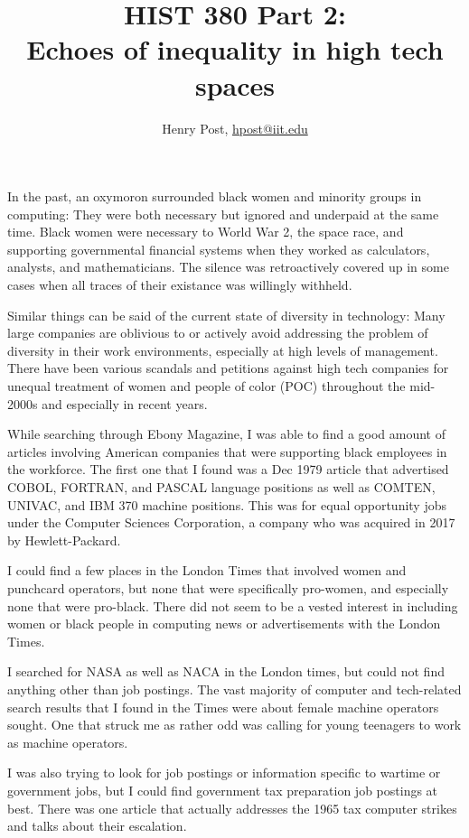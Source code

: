 \documentclass[a4paper,12pt]{article}
\title{HIST 380 Part 2: \\ Echoes of inequality in high tech spaces }
\author{Henry Post, \url{hpost@iit.edu}}
\begin{document}
\maketitle

\newpage

In the past, an oxymoron surrounded black women and minority groups in computing: They were both necessary but ignored and underpaid at the same time. Black women were necessary to World War 2, the space race, and supporting governmental financial systems when they worked as calculators, analysts, and mathematicians. The silence was retroactively covered up in some cases when all traces of their existance was willingly withheld.

Similar things can be said of the current state of diversity in technology: Many large companies are oblivious to or actively avoid addressing the problem of diversity in their work environments, especially at high levels of management. There have been various scandals and petitions against high tech companies for unequal treatment of women and people of color (POC) throughout the mid-2000s and especially in recent years.

While searching through Ebony Magazine, I was able to find a good amount of articles involving American companies that were supporting black employees in the workforce. The first one that I found was a Dec 1979 article\cite{csc} that advertised COBOL, FORTRAN, and PASCAL language positions as well as COMTEN, UNIVAC, and IBM 370 machine positions. This was for equal opportunity jobs under the Computer Sciences Corporation, a company who was acquired in 2017 by Hewlett-Packard.

I could find a few places in the London Times that involved women and punchcard operators, but none that were specifically pro-women, and especially none that were pro-black. There did not seem to be a vested interest in including women or black people in computing news or advertisements with the London Times.

I searched for NASA as well as NACA in the London times, but could not find anything other than job postings. The vast majority of computer and tech-related search results that I found in the Times were about female machine operators sought. One that struck me as rather odd was calling for young teenagers to work as machine operators\cite{youngmachineop}.

I was also trying to look for job postings or information specific to wartime or government jobs, but I could find government tax preparation job postings at best. There was one article that actually addresses the 1965 tax computer strikes \cite{taxstrikes} and talks about their escalation.
\end{document}
